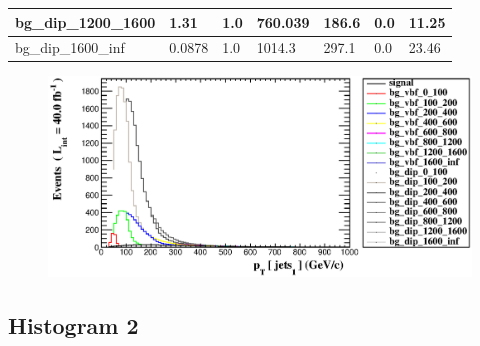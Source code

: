 \documentclass[a4paper, 10pt]{article}
\begin{document}
\begin{table}[H]
\begin{center}
\begin{tabular}{|m{23.0mm}|m{23.0mm}|m{18.0mm}|m{19.0mm}|m{19.0mm}|m{19.0mm}|m{19.0mm}|}
      \hline
      {\cellcolor{white}         bg\_dip\_1200\_1600}& {\cellcolor{white}         1.31}& {\cellcolor{white}         1.0}& {\cellcolor{white}         760.039}& {\cellcolor{white}         186.6}& {\cellcolor{orange}         0.0}& {\cellcolor{orange}         11.25}\\
      \hline
      {\cellcolor{white}         bg\_dip\_1600\_inf}& {\cellcolor{white}         0.0878}& {\cellcolor{white}         1.0}& {\cellcolor{white}         1014.3}& {\cellcolor{white}         297.1}& {\cellcolor{red}         0.0}& {\cellcolor{red}         23.46}\\
\hline
    \end{tabular}
  \end{center}
\end{table}

\begin{figure}[H]
  \begin{center}
    \includegraphics[scale=0.45]{selection_0.eps}\\
\caption{   }
  \end{center}
\end{figure}
      \newpage
\subsection{ Histogram 2}
\end{document}

